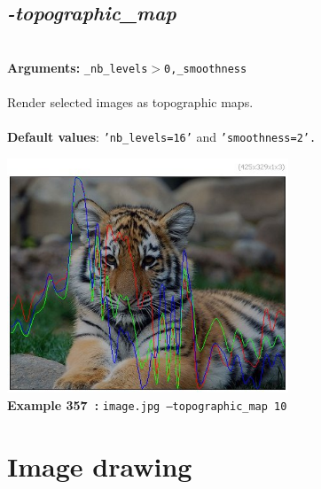 \documentclass[a4paper,11pt,twoside]{book}
\begin{document}
\subsection{\emph{-topographic\_map} }\vspace*{-0.5em}
~\\\textbf{Arguments: } 
{\small \texttt{\_nb\_levels$>$0,\_smoothness}}\\~\\
Render selected images as topographic maps.
~\\~\\\textbf{Default values}: {\small \texttt{'nb\_levels=16'} and \texttt{'smoothness=2'.}}
\begin{center}\includegraphics[keepaspectratio=true,height=7cm,width=\textwidth]{img/gmic_def357.jpg}\\
{\footnotesize \textbf{Example 357~:} \texttt{image.jpg --topographic\_map 10}}
\end{center}
\section{Image drawing}
\end{document}
